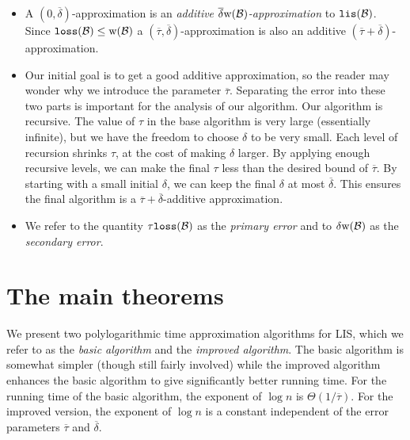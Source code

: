 \documentclass{acmsmall}
\newcommand{\cB}{{\cal B}}
\newcommand{\lis}{{\tt lis}}
\newcommand{\loss}{{\tt loss}}
\newcommand{\deltapar}{\overline{\delta}}
\newcommand{\taupar}{\overline{\tau}}
\newcommand{\width}{{\bf {\rm  w}}}
\begin{document}
\begin{itemize}
\item A $(0,\deltapar)$-approximation is an 
{\em additive $\deltapar \width(\cB)$-approximation} 
to $\lis(\cB)$.
Since $\loss(\cB) \leq \width(\cB)$ a
$(\taupar,\deltapar)$-approximation is also an additive 
$(\taupar+\deltapar)$-approximation. 
\item Our initial goal is to get a good additive approximation, so the reader may wonder why we introduce
the parameter $\taupar$.  Separating the error into these two parts is important for the analysis of our algorithm.
Our algorithm
is recursive. The value of $\tau$ in the base algorithm is very large (essentially infinite), but we have the freedom
to choose $\delta$ to be very 
small.  Each level of recursion shrinks $\tau$, at the cost
of making $\delta$ larger.  By applying enough
recursive levels, we can make the final $\tau$ less than the desired bound of $\taupar$. 
By starting with a small initial $\delta$, we can keep the final $\delta$ at most $\deltapar$. This ensures 
the final algorithm is a $\taupar + \deltapar$-additive approximation.
\item We refer to the quantity $\tau \loss(\cB)$ as the {\em primary error} and
to $\delta \width(\cB)$ as the {\em secondary error}.
\end{itemize}

\section{The main theorems}
\label{sec:main}

We present two polylogarithmic time approximation algorithms for LIS, which we refer to as  the {\em basic algorithm}
and
the {\em improved algorithm}. The basic algorithm is somewhat simpler (though still fairly involved) while the improved algorithm
enhances the basic algorithm to give significantly better running time.  For the running time of the basic algorithm, 
the exponent of $\log n$ is $\Theta(1/\taupar)$.  For the improved version, the exponent of $\log n$ is a constant
independent of the error parameters $\taupar$ and $\deltapar$. 
\end{document}
